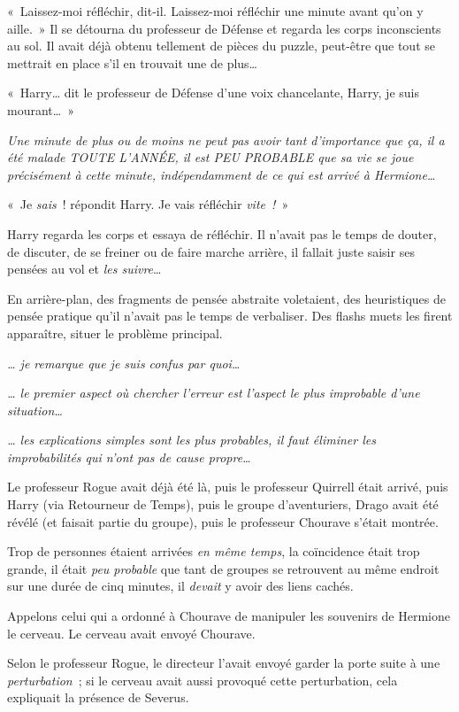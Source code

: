 «~Laissez-moi réfléchir, dit-il. Laissez-moi réfléchir une minute avant qu'on y aille.~» Il se détourna du professeur de Défense et regarda les corps inconscients au sol. Il avait déjà obtenu tellement de pièces du puzzle, peut-être que tout se mettrait en place s'il en trouvait une de plus…

«~Harry… dit le professeur de Défense d'une voix chancelante, Harry, je suis mourant…~»

\emph{Une minute de plus ou de moins ne peut pas avoir tant d'importance que ça, il a été malade TOUTE L'ANNÉE, il est PEU PROBABLE que sa vie se joue précisément à cette minute, indépendamment de ce qui est arrivé à Hermione…}

«~Je \emph{sais}~! répondit Harry. Je vais réfléchir \emph{vite~!}~»

Harry regarda les corps et essaya de réfléchir. Il n'avait pas le temps de douter, de discuter, de se freiner ou de faire marche arrière, il fallait juste saisir ses pensées au vol et \emph{les suivre}…

En arrière-plan, des fragments de pensée abstraite voletaient, des heuristiques de pensée pratique qu'il n'avait pas le temps de verbaliser. Des flashs muets les firent apparaître, situer le problème principal.

\emph{… je remarque que je suis confus par quoi…}

\emph{… le premier aspect où chercher l'erreur est l'aspect le plus improbable d'une situation…}

\emph{… les explications simples sont les plus probables, il faut éliminer les improbabilités qui n'ont pas de cause propre…}

Le professeur Rogue avait déjà été là, puis le professeur Quirrell était arrivé, puis Harry (via Retourneur de Temps), puis le groupe d'aventuriers, Drago avait été révélé (et faisait partie du groupe), puis le professeur Chourave s'était montrée.

Trop de personnes étaient arrivées \emph{en même temps}, la coïncidence était trop grande, il était \emph{peu probable} que tant de groupes se retrouvent au même endroit sur une durée de cinq minutes, il \emph{devait} y avoir des liens cachés.

Appelons celui qui a ordonné à Chourave de manipuler les souvenirs de Hermione le cerveau. Le cerveau avait envoyé Chourave.

Selon le professeur Rogue, le directeur l'avait envoyé garder la porte suite à une \emph{perturbation}~; si le cerveau avait aussi provoqué cette perturbation, cela expliquait la présence de Severus.


